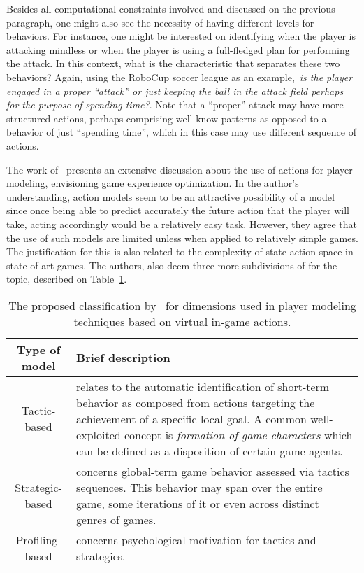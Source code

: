 Besides all computational constraints involved and discussed on the previous paragraph, one might also see  the necessity of having different levels for behaviors. For instance, one might be interested on identifying when the player is attacking mindless or when the player is using a full-fledged plan for performing the attack. In this context, what is the characteristic that separates these two behaviors? Again, using the RoboCup soccer league as an example,~\textit{is the player engaged in a proper ``attack'' or just keeping the ball in the attack field perhaps for the purpose of spending time?}. Note that a ``proper'' attack may have more structured actions, perhaps comprising well-know patterns as opposed to a behavior of just ``spending time'', which in this case may use different sequence of actions.

The work of~\cite{bakkes_player_2012} presents an extensive discussion about the use of actions for player modeling, envisioning game experience optimization. In the author's understanding, action models seem to be an attractive possibility of a model since once being able to predict accurately the future action that the player will take, acting accordingly would be a relatively easy task. However, they agree that the use of such models are limited unless when applied to relatively simple games. The justification for this is also related to the complexity of state-action space in state-of-art games. The authors, also deem three more subdivisions of for the topic, described on Table~\ref{actionModels}.

\begin{table}[!ht]
\centering
\caption{The proposed classification by~\cite{bakkes_player_2012} for dimensions used in player modeling techniques based on virtual in-game actions.}
\label{actionModels}
\begin{tabularx}{\textwidth}{|c|X|} \hline
\textbf{Type of model}&\textbf{Brief description}\\ \hline
Tactic-based & relates to the automatic identification of short-term behavior as composed from actions targeting the achievement of a specific local goal. A common well-exploited concept is \textit{formation of game characters} which can be defined as a disposition of certain game agents.\\ \hline
Strategic-based & concerns global-term game behavior assessed via tactics sequences. This behavior may span over the entire game, some iterations of it or even across distinct genres of games.\\ \hline
Profiling-based & concerns psychological motivation for tactics and strategies.\\ \hline
\end{tabularx}
\end{table}

